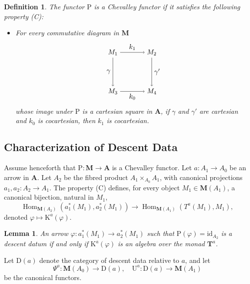 \documentclass{article}
\theoremstyle{plain}
\newtheorem{lemma}[theorem]{Lemma}
\newtheorem{definition}[theorem]{Definition}
\theoremstyle{remark}
\begin{document}
\begin{definition}
\label{def:chevalley}
The functor $\mathrm{P}$ is a \emph{Chevalley functor} if it satisfies the following property (C):
\begin{itemize}
    \item[(C)] For every commutative diagram in $\mathbf{M}$
    \[
    \begin{tikzpicture}[baseline=(current bounding box.center)]
        \node (M1) at (0,2) {$M_1$};
        \node (M2) at (2,2) {$M_2$};
        \node (M3) at (0,0) {$M_3$};
        \node (M4) at (2,0) {$M_4$};
        \draw[->] (M1) to node[above] {$k_1$} (M2);
        \draw[->] (M1) to node[left] {$\gamma$} (M3);
        \draw[->] (M2) to node[right] {$\gamma'$} (M4);
        \draw[->] (M3) to node[below] {$k_0$} (M4);
    \end{tikzpicture}
    \]
    whose image under $\mathrm{P}$ is a cartesian square in $\mathbf{A}$, if $\gamma$ and $\gamma'$ are cartesian and $k_0$ is cocartesian, then $k_1$ is cocartesian.
\end{itemize}
\end{definition}

\subsection{Characterization of Descent Data}

Assume henceforth that $\mathrm{P} : \mathbf{M} \to \mathbf{A}$ is a Chevalley functor. Let $a : A_1 \to A_0$ be an arrow in $\mathbf{A}$. Let $A_2$ be the fibred product $A_1 \times_{A_0} A_1$, with canonical projections $a_1, a_2 : A_2 \to A_1$. The property (C) defines, for every object $M_1 \in \mathbf{M}(A_1)$, a canonical bijection, natural in $M_1$,
\[
\operatorname{Hom}_{\mathbf{M}(A_2)}(a_1^*(M_1), a_2^*(M_1)) \to \operatorname{Hom}_{\mathbf{M}(A_1)}(T^a(M_1), M_1),
\]
denoted $\varphi \mapsto \mathrm{K}^a(\varphi)$.

\begin{lemma}
\label{lem:descent}
An arrow $\varphi : a_1^*(M_1) \to a_2^*(M_1)$ such that $\mathrm{P}(\varphi) = \mathrm{id}_{A_2}$ is a descent datum if and only if $\mathrm{K}^a(\varphi)$ is an algebra over the monad $\mathbf{T}^a$.
\end{lemma}

Let $\mathrm{D}(a)$ denote the category of descent data relative to $a$, and let
\[
\Psi^a : \mathbf{M}(A_0) \to \mathrm{D}(a), \quad \mathrm{U}^a : \mathrm{D}(a) \to \mathbf{M}(A_1)
\]
be the canonical functors.
\end{document}
